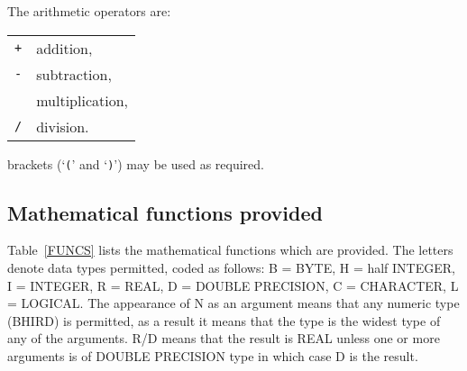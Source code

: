 The arithmetic operators are:

\begin{tabular}{ll}
{\tt +}  & addition,        \\
{\tt -}  & subtraction,     \\
{\tt *}  & multiplication,  \\
{\tt /}  & division.        \\
\end{tabular}

brackets (`{\tt (}' and `{\tt )}') may be used as required.


\subsection{Mathematical functions provided}

Table~\ref{FUNCS} lists the mathematical functions which are provided.
The letters denote data types permitted, coded as follows: B = BYTE,
H = half INTEGER, I = INTEGER, R = REAL, D = DOUBLE PRECISION, C =
CHARACTER, L = LOGICAL. The appearance of N as an argument means that
any numeric type (BHIRD) is permitted, as a result it means that the
type is the widest type of any of the arguments.  R/D means that the
result is REAL unless one or more arguments is of DOUBLE PRECISION
type in which case D is the result.

